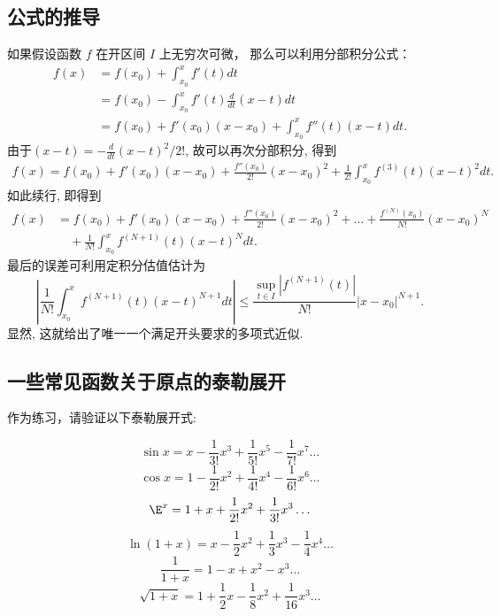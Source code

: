 \subsection{公式的推导}
如果假设函数 $f$ 在开区间 $I$ 上无穷次可微， 那么可以利用分部积分公式：
\begin{equation}
\begin{aligned}
f(x)
&=f(x_0)+\int_{x_0}^{x}f'(t)dt\\
&=f(x_0)-\int_{x_0}^{x}f'(t)\frac{d}{dt}(x-t)dt\\
&=f(x_0)+f'(x_0)(x-x_0)+\int_{x_0}^{x}f''(t)(x-t)dt.
\end{aligned}
\end{equation}
由于$(x-t)=-\frac{d}{dt}(x-t)^2/2!$, 故可以再次分部积分, 得到
\begin{equation}
\begin{aligned}
f(x)
=f(x_0)+f'(x_0)(x-x_0)+\frac{f''(x_0)}{2!}(x-x_0)^2
+\frac{1}{2!}\int_{x_0}^{x}f^{(3)}(t)(x-t)^2dt.
\end{aligned}
\end{equation}
如此续行, 即得到
\begin{equation}
\begin{aligned}
f(x)
&=f(x_0)+f'(x_0)(x-x_0)+\frac{f''(x_0)}{2!}(x-x_0)^2+...+\frac{f^{(N)}(x_0)}{N!}(x-x_0)^N\\
&\quad+\frac{1}{N!}\int_{x_0}^{x}f^{(N+1)}(t)(x-t)^{N}dt.
\end{aligned}
\end{equation}
最后的误差可利用定积分估值估计为
\begin{equation}\label{Taylor_eq7}
\left|\frac{1}{N!}\int_{x_0}^{x}f^{(N+1)}(t)(x-t)^{N+1}dt\right|
\leq\frac{\sup_{t\in I}|f^{(N+1)}(t)|}{N!}|x-x_0|^{N+1}.
\end{equation}
显然, 这就给出了唯一一个满足开头要求的多项式近似.

\subsection{一些常见函数关于原点的泰勒展开}
作为练习，请验证以下泰勒展开式:

\begin{equation}
\sin x = x - \frac{1}{3!} x^3 + \frac{1}{5!} x^5 - \frac{1}{7!} x^7 \ldots
\end{equation}
\begin{equation}
\cos x = 1 - \frac{1}{2!} x^2 + \frac{1}{4!} x^4 -\frac{1}{6!} x^6 \ldots
\end{equation}
\begin{equation}\label{Taylor_eq11}
\E^x =1 + x + \frac{1}{2!} x^2 + \frac{1}{3!} x^3  \ldots
\end{equation}
\begin{equation}
\ln (1+x) = x - \frac12 x^2 + \frac13 x^3 - \frac14 x^4 \ldots
\end{equation}
\begin{equation}
\frac{1}{1+x} = 1 - x + x^2 - x^3 \ldots
\end{equation}
\begin{equation}
\sqrt{1+x} = 1 + \frac12 x - \frac18 x^2 + \frac{1}{16} x^3 \ldots
\end{equation}

